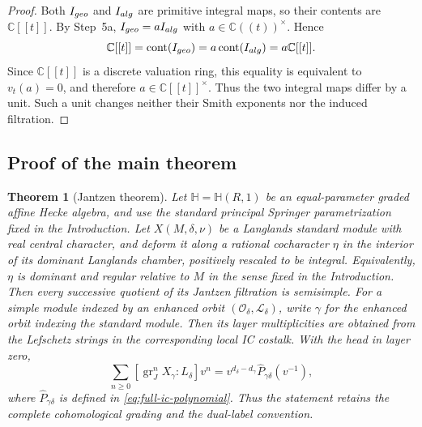 \documentclass[10pt,a4paper]{amsart}
\newtheorem{theorem}{Theorem}[section]
\newcommand{\Hh}{\mathbb H}
\newcommand{\C}{\mathbb C}
\newcommand{\A}{\C[[t]]}
\newcommand{\K}{\C((t))}
\begin{document}
\begin{proof}
Both $I_{\rm geo}$ and $I_{\rm alg}$ are primitive integral maps, so their
contents are $\A$.  By Step~5a,
$I_{\rm geo}=aI_{\rm alg}$ with $a\in\K^\times$.  Hence
\[
 \A=\operatorname{cont}(I_{\rm geo})
 =a\operatorname{cont}(I_{\rm alg})=a\A.
\]
Since $\A$ is a discrete valuation ring, this equality is equivalent to
$v_t(a)=0$, and therefore $a\in\A^\times$.  Thus the two integral maps
differ by a unit.  Such a unit changes neither their Smith exponents nor the
induced filtration.
\end{proof}

\subsection{Proof of the main theorem}


\begin{theorem}[Jantzen theorem]
\label{thm:equal-parameter-jantzen}
Let $\Hh=\Hh(R,1)$ be an equal-parameter graded affine Hecke algebra, and use
the standard principal Springer parametrization fixed in the Introduction.
Let $X(M,\delta,\nu)$ be a Langlands standard module with real central
character, and deform it along a rational cocharacter $\eta$ in the
interior of its dominant Langlands chamber, positively rescaled to be
integral.  Equivalently, $\eta$ is dominant and regular relative to $M$ in
the sense fixed in the Introduction.  Then every
successive quotient of its Jantzen filtration is semisimple.  For a simple
module indexed by an enhanced orbit $(\mathcal O_\delta,\mathcal L_\delta)$,
write $\gamma$ for the enhanced orbit indexing the standard module.  Then
its layer multiplicities are obtained from the Lefschetz strings in the
corresponding local IC costalk.  With the head in layer zero,
\[
 \sum_{n\geq 0}[\operatorname{gr}_J^nX_\gamma:L_\delta]v^n
 =v^{d_\delta-d_\gamma}\widehat P_{\gamma\delta}(v^{-1}),
\]
where $\widehat P_{\gamma\delta}$ is defined in
\eqref{eq:full-ic-polynomial}.  Thus the statement retains the complete
cohomological grading and the dual-label convention.
\end{theorem}
\end{document}
